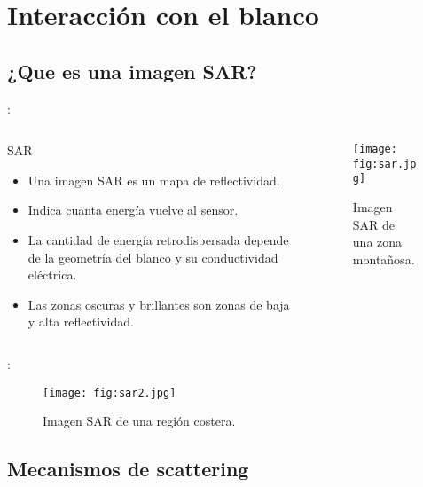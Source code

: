\section{Interacción con el blanco}
\subsection{¿Que es una imagen SAR?}
\begin{frame}{\secname : \subsecname}
  \begin{columns}[t]
    \begin{column}{0.5\textwidth}
     \begin{block}{SAR}
       \begin{itemize}
         \item Una imagen SAR es un mapa de reflectividad.
         \item Indica cuanta energía vuelve al sensor.
         \item La cantidad de energía retrodispersada depende de la geometría del blanco y su conductividad eléctrica.
         \item Las zonas oscuras y brillantes son zonas de baja y alta reflectividad.
       \end{itemize}
     \end{block}
    \end{column}
    \begin{column}{0.5\textwidth}  %
        \begin{figure}
          \centering
          \texttt{[image: fig:sar.jpg]}
          \caption{Imagen SAR de una zona montañosa.}
          \label{}
        \end{figure}
    \end{column}
    \end{columns}
\end{frame}

\begin{frame}{\secname : \subsecname}
    \begin{figure}
      \centering
      \texttt{[image: fig:sar2.jpg]}
      \caption{Imagen SAR de una región costera.}
      \label{}
    \end{figure}
\end{frame}

\subsection{Mecanismos de scattering}

